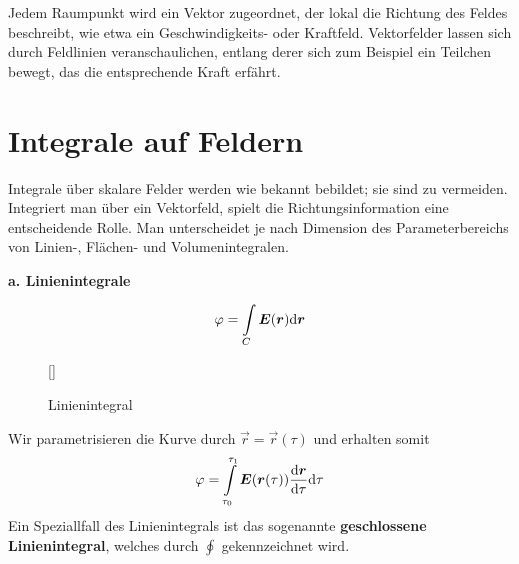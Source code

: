 Jedem Raumpunkt wird ein Vektor zugeordnet, der lokal die Richtung des Feldes beschreibt, wie etwa ein Geschwindigkeits- oder Kraftfeld. Vektorfelder lassen sich durch Feldlinien veranschaulichen, entlang derer sich zum Beispiel ein Teilchen bewegt, das die entsprechende Kraft erfährt.


\section{Integrale auf Feldern}
Integrale über skalare Felder werden wie bekannt bebildet; sie sind zu vermeiden.\\
Integriert man über ein Vektorfeld, spielt die Richtungsinformation eine entscheidende Rolle. Man unterscheidet je nach Dimension des Parameterbereichs von Linien-, Flächen- und Volumenintegralen.\\
\linebreak


\textbf{a. Linienintegrale}

\begin{equation*}
\varphi=\int\limits_{C}\bm{E}(\bm{r})\mathrm{d}\bm{r}
\end{equation*}

\begin{wrapfigure}[]{r}[0cm]{0cm}
	\raisebox{0pt}[\dimexpr{}\baselineskip\relax]{
		\colorbox{hgrey}{
		}
	}
	\caption{Linienintegral}
\end{wrapfigure}
Wir parametrisieren die Kurve durch $\vec{r}=\vec{r}(\tau)$ und erhalten somit
\begin{equation*}
\varphi=\int\limits_{\tau_0}^{\tau_1}\bm{E}(\bm{r}(\tau))\frac{\mathrm{d}{\bm{r}}}{\mathrm{d}{\tau}}\mathrm{d} \tau
\end{equation*}
Ein Speziallfall des Linienintegrals ist das sogenannte \textbf{geschlossene Linienintegral}, welches durch $\oint$ gekennzeichnet wird.\\
\linebreak


